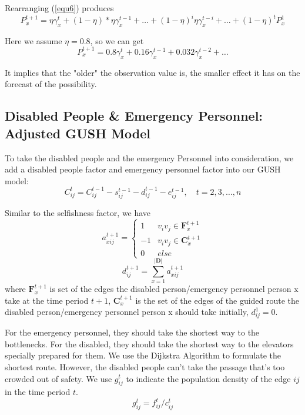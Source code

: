 \documentclass[a4paper,12pt]{article}
\begin{document}
Rearranging (\ref{equ6}) produces
\begin{equation}
\label{equ8}
    P^{t+1}_x=\eta \gamma ^t_x +(1-\eta)*\eta \gamma^{t-1}_x + \ldots + (1-\eta)^i \eta \gamma^{t-i}_x+ \ldots + (1-\eta)^t P^1_x
\end{equation}

Here we assume $\eta=0.8$, so we can get
\begin{equation}
\label{equ9}
P^{t+1}_x=0.8\gamma ^t_x+0.16\gamma ^{t-1}_x+0.032\gamma ^{t-2}_x + \ldots
\end{equation}

It implies that the "older" the observation value is, the smaller effect it has on the forecast of the possibility.

\subsection{Disabled People \& Emergency Personnel: Adjusted GUSH Model}
To take the disabled people and the emergency Personnel into consideration, we add a disabled people factor and emergency personnel factor into our GUSH model:
\begin{equation}
\label{equ10}
    C^t_{ij}=C^{t-1}_{ij}-s^{t-1}_{ij}-d^{t-1}_{ij}-e^{t-1}_{ij},\quad t=2,3,\ldots,n
\end{equation}

Similar to the selfishness factor, we have
\begin{equation}  
\label{equ11}
a^{t+1}_{xij}=
\left\{
  \begin{array}{ll}
    1 & v_i v_j\in \bm{F}^{t+1}_x\\ 
    -1 & v_i v_j\in \bm{C}^{t+1}_x\\ 
    0 & else
  \end{array}
\right.
\end{equation}
\begin{equation}
\label{equ12}
d^{t+1}_{ij}=\sum_{x=1}^{\left | \bm{D}  \right |} a^{t+1}_{xij}  
\end{equation}
where $\bm{F}^{t+1}_x$ is set of the edges the disabled person/emergency personnel person x take at the time period $t+1$, $\bm{C}^{t+1}_x$ is the set of the edges of the guided route the disabled person/emergency personnel person x should take initially, $d^1_{ij}=0$.

For the emergency personnel, they should take the shortest way to the bottlenecks. For the disabled, they should take the shortest way to the elevators specially prepared for them. We use the Dijkstra Algorithm to formulate the shortest route. However, the disabled people can't take the passage that's too crowded out of safety. We use $g^t_{ij}$ to indicate the population density of the edge $ij$ in the time period $t$.
\begin{equation}
\label{equ13}
    g^t_{ij}=f^t_{ij}/c^t_{ij}
\end{equation}
\end{document}
